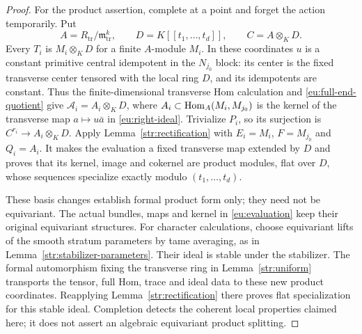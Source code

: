 \begin{proof}
For the product assertion, complete at a point and forget the action
temporarily.  Put
\[
 A=R_{\mathrm{tr}}/\mathfrak m_{\mathrm{tr}}^k,
 \qquad D=K[[t_1,\ldots,t_d]],\qquad C=A\otimes_KD.
\]
Every $T_i$ is $M_i\otimes_KD$ for a finite $A$-module $M_i$.
In these coordinates $u$ is a constant primitive central idempotent
in the $N_{j_0}$ block: its center is the fixed transverse center
tensored with the local ring $D$, and its idempotents are constant.
Thus the finite-dimensional transverse Hom calculation and
\eqref{eu:full-end-quotient} give
$\mathcal A_i=A_i\otimes_KD$, where
$A_i\subset\operatorname{Hom}_A(M_i,M_{j_0})$ is the kernel of the transverse
map $a\mapsto u\bar a$ in \eqref{eu:right-ideal}.
Trivialize $P_i$, so its surjection is $C^{r_i}\to A_i\otimes_KD$.
Apply Lemma~\ref{str:rectification} with $E_i=M_i$, $F=M_{j_0}$
and $Q_i=A_i$.  It makes the evaluation a fixed transverse map
extended by $D$ and proves that its kernel, image and cokernel are
product modules, flat over $D$, whose sequences specialize exactly
modulo $(t_1,\ldots,t_d)$.

These basis changes establish formal product form only; they need not
be equivariant.  The actual bundles, maps and kernel in
\eqref{eu:evaluation} keep their original equivariant structures.
For character calculations, choose equivariant lifts of the smooth
stratum parameters by tame averaging, as in
Lemma~\ref{str:stabilizer-parameters}.  Their ideal is stable under the
stabilizer. The formal automorphism fixing the transverse ring in
Lemma~\ref{str:uniform} transports the tensor, full Hom, trace and
ideal data to these new product coordinates. Reapplying
Lemma~\ref{str:rectification} there proves flat specialization for
this stable ideal. Completion detects the
coherent local properties claimed here; it does not assert an
algebraic equivariant product splitting.
\end{proof}

